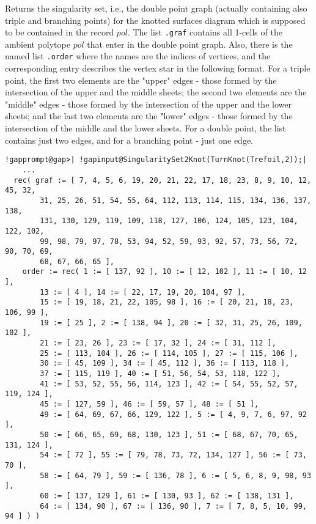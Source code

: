 \documentclass[a4paper,11pt]{report}
\begin{document}
{{{ Returns the singularity set, i.e., the double point graph (actually containing
also triple and branching points) for the knotted surfaces diagram which is
supposed to be contained in the record $pol$. The list \texttt{.graf} contains all 1-cells of the ambient polytope $pol$ that enter in the double point graph. Also, there is the named list \texttt{.order} where the names are the indices of vertices, and the corresponding entry
describes the vertex star in the following format. For a triple point, the
first two elements are the "upper" edges - those formed by the intersection of
the upper and the middle sheets; the second two elements are the "middle"
edges - those formed by the intersection of the upper and the lower sheets;
and the last two elements are the "lower" edges - those formed by the
intersection of the middle and the lower sheets. For a double point, the list
contains just two edges, and for a branching point - just one edge. 
\begin{Verbatim}[commandchars=!@|,fontsize=\small,frame=single,label=Example]
  !gapprompt@gap>| !gapinput@SingularitySet2Knot(TurnKnot(Trefoil,2));|
  	...
  rec( graf := [ 7, 4, 5, 6, 19, 20, 21, 22, 17, 18, 23, 8, 9, 10, 12, 45, 32,
        31, 25, 26, 51, 54, 55, 64, 112, 113, 114, 115, 134, 136, 137, 138,
        131, 130, 129, 119, 109, 118, 127, 106, 124, 105, 123, 104, 122, 102,
        99, 98, 79, 97, 78, 53, 94, 52, 59, 93, 92, 57, 73, 56, 72, 90, 70, 69,
        68, 67, 66, 65 ],
    order := rec( 1 := [ 137, 92 ], 10 := [ 12, 102 ], 11 := [ 10, 12 ],
        13 := [ 4 ], 14 := [ 22, 17, 19, 20, 104, 97 ],
        15 := [ 19, 18, 21, 22, 105, 98 ], 16 := [ 20, 21, 18, 23, 106, 99 ],
        19 := [ 25 ], 2 := [ 138, 94 ], 20 := [ 32, 31, 25, 26, 109, 102 ],
        21 := [ 23, 26 ], 23 := [ 17, 32 ], 24 := [ 31, 112 ],
        25 := [ 113, 104 ], 26 := [ 114, 105 ], 27 := [ 115, 106 ],
        30 := [ 45, 109 ], 34 := [ 45, 112 ], 36 := [ 113, 118 ],
        37 := [ 115, 119 ], 40 := [ 51, 56, 54, 53, 118, 122 ],
        41 := [ 53, 52, 55, 56, 114, 123 ], 42 := [ 54, 55, 52, 57, 119, 124 ],
        45 := [ 127, 59 ], 46 := [ 59, 57 ], 48 := [ 51 ],
        49 := [ 64, 69, 67, 66, 129, 122 ], 5 := [ 4, 9, 7, 6, 97, 92 ],
        50 := [ 66, 65, 69, 68, 130, 123 ], 51 := [ 68, 67, 70, 65, 131, 124 ],
        54 := [ 72 ], 55 := [ 79, 78, 73, 72, 134, 127 ], 56 := [ 73, 70 ],
        58 := [ 64, 79 ], 59 := [ 136, 78 ], 6 := [ 5, 6, 8, 9, 98, 93 ],
        60 := [ 137, 129 ], 61 := [ 130, 93 ], 62 := [ 138, 131 ],
        64 := [ 134, 90 ], 67 := [ 136, 90 ], 7 := [ 7, 8, 5, 10, 99, 94 ] ) )
  					

\end{Verbatim}}}}
\end{document}
